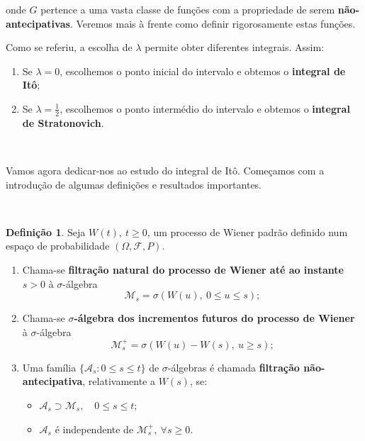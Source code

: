 \documentclass[
  11pt,
  a4paper,
]{book}
\theoremstyle{definition}
\newtheorem{definition}{Definição}[chapter]
\theoremstyle{definition}
\theoremstyle{definition}
\theoremstyle{definition}
\theoremstyle{remark}
\begin{document}
onde \(G\) pertence a uma vasta classe de funções com a propriedade de serem \textbf{não-antecipativas}. Veremos mais à frente como definir rigorosamente estas funções.

Como se referiu, a escolha de \(\lambda\) permite obter diferentes integrais. Assim:

\begin{enumerate}
\def\labelenumi{(\roman{enumi})}
\item
  Se \(\lambda = 0\), escolhemos o ponto inicial do intervalo e obtemos o \textbf{integral de Itô};
\item
  Se \(\lambda = \frac{1}{2}\), escolhemos o ponto intermédio do intervalo e obtemos o \textbf{integral de Stratonovich}.
\end{enumerate}

\(\,\)

Vamos agora dedicar-nos ao estudo do integral de Itô. Começamos com a introdução de algumas definições e resultados importantes.

\(\,\)

\begin{definition}

Seja \(W(t),\ t \geq 0\), um processo de Wiener padrão definido num espaço de probabilidade \((\Omega, \mathcal{F}, P)\).

\begin{enumerate}
\def\labelenumi{\arabic{enumi}.}
\item
  Chama-se \textbf{filtração natural do processo de Wiener até ao instante} \(s > 0\) à \(\sigma\)-álgebra
  \[
  \mathcal{M}_s = \sigma(W(u),\ 0 \leq u \leq s);
  \]
\item
  Chama-se \textbf{\(\sigma\)-álgebra dos incrementos futuros do processo de Wiener} à \(\sigma\)-álgebra
  \[
  \mathcal{M}_s^+ = \sigma(W(u) - W(s),\ u \geq s);
  \]
\item
  Uma família \(\{ \mathcal{A}_s : 0 \leq s \leq t \}\) de \(\sigma\)-álgebras é chamada \textbf{filtração não-antecipativa}, relativamente a \(W(s)\), se:

  \begin{itemize}
  \item
    \(\mathcal{A}_s \supset \mathcal{M}_s,\quad 0 \leq s \leq t;\)
  \item
    \(\mathcal{A}_s\) é independente de \(\mathcal{M}_s^+,\ \forall s \geq 0.\)
  \end{itemize}
\end{enumerate}

\end{definition}
\end{document}
